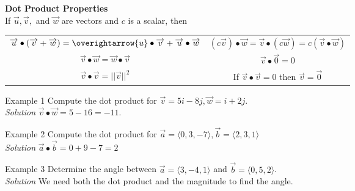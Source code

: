 \documentclass{article}
\begin{document}
            \noindent \color{red} \textbf{Dot Product Properties}\\ \color{black} If
            $\overrightarrow{u}, \overrightarrow{v},$ and $\overrightarrow{w}$ are vectors and
            $c$ is a scalar, then

            \begin{center}
                \begin{tabular} {c|c}
                    $\overrightarrow{u}\bullet(\overrightarrow{v}+\overrightarrow{w})
                    =\overightarrow{u}\bullet\overrightarrow{v}+\overrightarrow{u}\bullet\overrightarrow{w}$
                    & $(c\overrightarrow{v})\bullet\overrightarrow{w}
                    =\overrightarrow{v}\bullet(c\overrightarrow{w})
                    =c(\overrightarrow{v}\bullet\overrightarrow{w})$ \\
                    $\overrightarrow{v}\bullet\overrightarrow{w}
                    =\overrightarrow{w}\bullet\overrightarrow{v}$
                    & $\overrightarrow{v}\bullet\overrightarrow{0}=0$\\
                    $\overrightarrow{v}\bullet\overrightarrow{v}=||\overrightarrow{v}||^2$
                    & If $\overrightarrow{v}\bullet\overrightarrow{v}=0$ then
                    $\overrightarrow{v}=\overrightarrow{0}$
                \end{tabular}
            \end{center}

            \noindent \color{blue} Example 1 \color{black} Compute the dot product for
            $\overrightarrow{v}=5i-8j, \overrightarrow{w}=i+2j$.\\

            \noindent \textit{Solution} $\overrightarrow{v}\bullet\overrightarrow{w}=5-16=-11$.

            \noindent \color{blue} Example 2 \color{black} Compute the dot product for
            $\overrightarrow{a}=\langle0,3,-7\rangle, \overrightarrow{b}=\langle 2,3,1\rangle$\\

            \noindent \textit{Solution} $\overrightarrow{a}\bullet\overrightarrow{b}=0+9-7=2$

            \noindent \color{blue} Example 3 \color{black} Determine the angle between
            $\overrightarrow{a}=\langle 3,-4,1\rangle$ and $\overrightarrow{b}=\langle 0,5,2\rangle$.\\
            \textit{Solution} We need both the dot product and the magnitude to find the angle.
\end{document}
